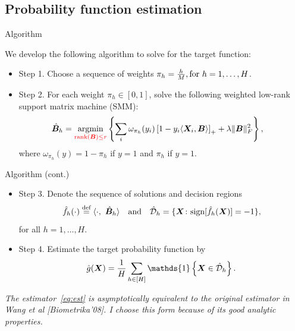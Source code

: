 \documentclass[compress,dvipsnames]{beamer}
\let\olditem\item
\renewcommand\item{\olditem\justifying}
\begin{document}
\subsection{Probability function estimation}
\begin{frame}{Algorithm}

We develop the following algorithm to solve for the target function: 
\begin{itemize}
\item Step 1. Choose a sequence of weights $\pi_h = {h\over M}, \text{for }h=1,\ldots,H$.
\item Step 2. For each weight $\pi_h\in[0,1]$, solve the following {\color{red}weighted low-rank support matrix machine (SMM)}:
\begin{align}\label{eq:sequence}
\hat {\bm{B}}_h&=\operatorname*{argmin}_{{\color{red}\text{rank}(\bm{B})\leq r}} \left\{\sum_{i}\omega_{\pi_h}(y_i)\left[1-y_i\langle \bm{X}_i,\bm{B} \rangle\right]_++\lambda\lVert\bm{B}\rVert_F^2\right\},
\end{align}
\vspace{-2cm}
where $\omega_{\pi_h}(y) = 1-\pi_h$ if $y = 1$ and $\pi_h$ if $y =1$.
\end{itemize}
\end{frame}

\begin{frame}{Algorithm (cont.)}
\begin{itemize}
\item Step 3. Denote the sequence of solutions and decision regions
\[
\hat f_h (\cdot)\stackrel{\text{def}}{=}\langle \cdot,\ \hat {\bm{B}}_h \rangle \quad \text{and}\quad \hat {{\mathcal D}}_h=\{\bm{X}\colon\text{sign}[\hat f_h(\bm{X})] = -1 \},
\]
for all $h=1,\ldots,H$.
\item Step 4. Estimate the target probability function by
\begin{align}\label{eq:est}
\hat g(\mX)={1\over H} \sum_{h\in[H]} \mathds{1}\left\{\mX\in \hat \tD_h \right\}.
\end{align}

\end{itemize}
{\scriptsize \it The estimator~\eqref{eq:est} is asymptotically equivalent to the original estimator in Wang et al [Biometrika'08]. I choose this form because of its good analytic properties.}

\end{frame}
\end{document}
